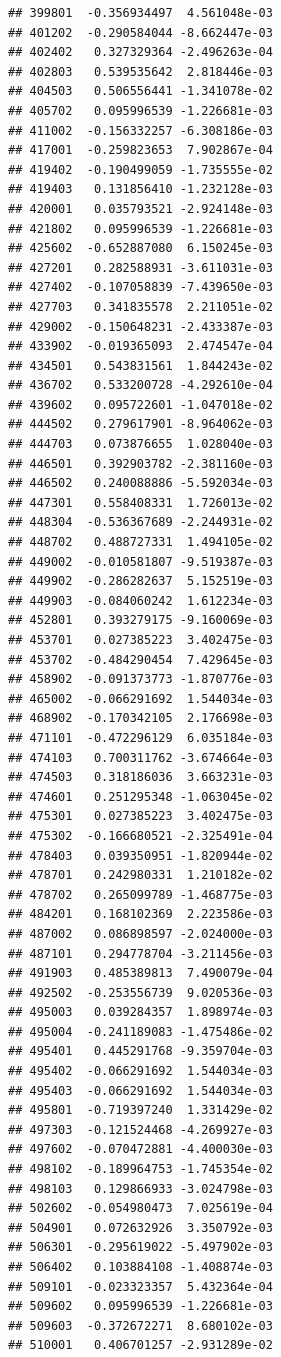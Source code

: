 \begin{frame}[fragile]
\begin{verbatim}
## 399801  -0.356934497  4.561048e-03
## 401202  -0.290584044 -8.662447e-03
## 402402   0.327329364 -2.496263e-04
## 402803   0.539535642  2.818446e-03
## 404503   0.506556441 -1.341078e-02
## 405702   0.095996539 -1.226681e-03
## 411002  -0.156332257 -6.308186e-03
## 417001  -0.259823653  7.902867e-04
## 419402  -0.190499059 -1.735555e-02
## 419403   0.131856410 -1.232128e-03
## 420001   0.035793521 -2.924148e-03
## 421802   0.095996539 -1.226681e-03
## 425602  -0.652887080  6.150245e-03
## 427201   0.282588931 -3.611031e-03
## 427402  -0.107058839 -7.439650e-03
## 427703   0.341835578  2.211051e-02
## 429002  -0.150648231 -2.433387e-03
## 433902  -0.019365093  2.474547e-04
## 434501   0.543831561  1.844243e-02
## 436702   0.533200728 -4.292610e-04
## 439602   0.095722601 -1.047018e-02
## 444502   0.279617901 -8.964062e-03
## 444703   0.073876655  1.028040e-03
## 446501   0.392903782 -2.381160e-03
## 446502   0.240088886 -5.592034e-03
## 447301   0.558408331  1.726013e-02
## 448304  -0.536367689 -2.244931e-02
## 448702   0.488727331  1.494105e-02
## 449002  -0.010581807 -9.519387e-03
## 449902  -0.286282637  5.152519e-03
## 449903  -0.084060242  1.612234e-03
## 452801   0.393279175 -9.160069e-03
## 453701   0.027385223  3.402475e-03
## 453702  -0.484290454  7.429645e-03
## 458902  -0.091373773 -1.870776e-03
## 465002  -0.066291692  1.544034e-03
## 468902  -0.170342105  2.176698e-03
## 471101  -0.472296129  6.035184e-03
## 474103   0.700311762 -3.674664e-03
## 474503   0.318186036  3.663231e-03
## 474601   0.251295348 -1.063045e-02
## 475301   0.027385223  3.402475e-03
## 475302  -0.166680521 -2.325491e-04
## 478403   0.039350951 -1.820944e-02
## 478701   0.242980331  1.210182e-02
## 478702   0.265099789 -1.468775e-03
## 484201   0.168102369  2.223586e-03
## 487002   0.086898597 -2.024000e-03
## 487101   0.294778704 -3.211456e-03
## 491903   0.485389813  7.490079e-04
## 492502  -0.253556739  9.020536e-03
## 495003   0.039284357  1.898974e-03
## 495004  -0.241189083 -1.475486e-02
## 495401   0.445291768 -9.359704e-03
## 495402  -0.066291692  1.544034e-03
## 495403  -0.066291692  1.544034e-03
## 495801  -0.719397240  1.331429e-02
## 497303  -0.121524468 -4.269927e-03
## 497602  -0.070472881 -4.400030e-03
## 498102  -0.189964753 -1.745354e-02
## 498103   0.129866933 -3.024798e-03
## 502602  -0.054980473  7.025619e-04
## 504901   0.072632926  3.350792e-03
## 506301  -0.295619022 -5.497902e-03
## 506402   0.103884108 -1.408874e-03
## 509101  -0.023323357  5.432364e-04
## 509602   0.095996539 -1.226681e-03
## 509603  -0.372672271  8.680102e-03
## 510001   0.406701257 -2.931289e-02

\end{verbatim}
\end{frame}
